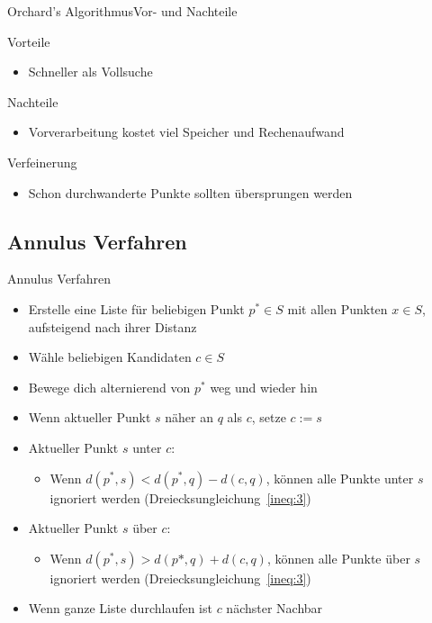 \documentclass{beamer}
\begin{document}
\begin{frame}{Orchard’s Algorithmus}{Vor- und Nachteile}
 \begin{block}{Vorteile}
  \begin{itemize}
   \item Schneller als Vollsuche
  \end{itemize}
 \end{block}
 \pause
 \begin{block}{Nachteile}
  \begin{itemize}
   \item Vorverarbeitung kostet viel Speicher und Rechenaufwand
  \end{itemize}
 \end{block}
 \pause
 \begin{block}{Verfeinerung}
  \begin{itemize}
   \item Schon durchwanderte Punkte sollten übersprungen werden
  \end{itemize}
 \end{block}
\end{frame}

\subsection{Annulus Verfahren}
\begin{frame}{Annulus Verfahren}
 \begin{itemize}
  \item Erstelle eine Liste für beliebigen Punkt $p^* \in S$ mit allen Punkten $x \in S$, aufsteigend nach ihrer Distanz
  \pause
  \item Wähle beliebigen Kandidaten $c \in S$
  \pause
  \item Bewege dich alternierend von $p^*$ weg und wieder hin
  \pause
  \item Wenn aktueller Punkt $s$ näher an $q$ als $c$, setze $c:= s$
  \pause
  \item Aktueller Punkt $s$ unter $c$:
  \begin{itemize}
   \item Wenn $d(p^*, s) < d(p^*, q) - d(c, q)$, können alle Punkte unter $s$ ignoriert werden (Dreiecksungleichung~\ref{ineq:3})
  \end{itemize}
  \pause
  \item Aktueller Punkt $s$ über $c$:
  \begin{itemize}
   \item Wenn $d(p^*, s) > d(p*, q) + d(c, q)$, können alle Punkte über $s$ ignoriert werden (Dreiecksungleichung~\ref{ineq:3})
  \end{itemize}
  \pause
  \item Wenn ganze Liste durchlaufen ist $c$ nächster Nachbar
 \end{itemize}
\end{frame}
\end{document}
